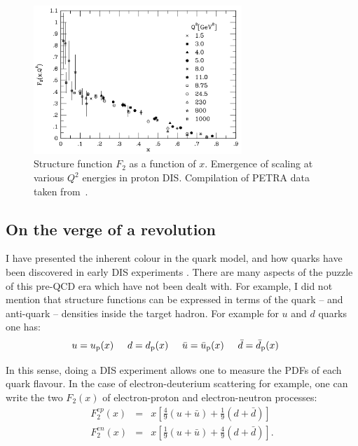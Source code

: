 \begin{figure}[h]
\begin{center}
  \includegraphics[width=0.7\textwidth]{Chapters/pQCD/F2scaling.png}
 \caption{Structure function $F_{2}$ as a function of $x$. Emergence
   of scaling at various $Q^{2}$ energies in proton DIS. Compilation
   of PETRA data taken from~\cite{webber3}.}
 \label{fig:F2scaling}
\end{center}
\end{figure}

\subsection{On the verge of a revolution}
\label{sec:verge}
I have presented the inherent colour in the quark model, and how
quarks have been discovered in early DIS experiments%
. There are many
aspects of the puzzle of this pre-QCD era which 
have not been dealt with. For example, I did not mention that structure
functions can be expressed in terms of the quark -- and anti-quark --
densities inside the target hadron. For example for $u$ and $d$ quarks one
has:
\begin{equation}
u= u_{\rm p}(x) \hspace{0.5cm}d= d_{\rm p}(x) \hspace{0.5cm}\bar{u}= \bar{u}_{\rm p}(x) \hspace{0.5cm}\bar{d}= \bar{d}_{\rm p}(x) \hspace{0.5cm}
\end{equation}

In this sense, doing a DIS experiment allows one to measure the PDFs of
each quark flavour. In the case of electron-deuterium scattering for example, one can
write the two $F_2(x)$ of electron-proton and electron-neutron processes:
\begin{eqnarray}
F_{2}^{ep}(x) &=& x\left[ \frac{4}{9}(u+\bar{u}) + \frac{1}{9}(d+\bar{d}) \right]\\
F_{2}^{en}(x) &=& x\left[ \frac{1}{9}(u+\bar{u}) + \frac{4}{9}(d+\bar{d}) \right].
\end{eqnarray}

